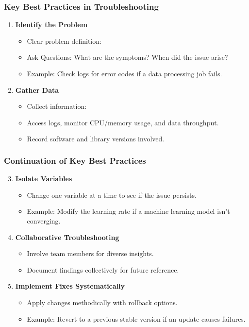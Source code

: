 \documentclass[aspectratio=169]{beamer}
\begin{document}
\begin{frame}[fragile]
    \frametitle{Key Best Practices in Troubleshooting}
    \begin{enumerate}
        \item \textbf{Identify the Problem}
        \begin{itemize}
            \item Clear problem definition:
            \item Ask Questions: What are the symptoms? When did the issue arise? 
            \item Example: Check logs for error codes if a data processing job fails.
        \end{itemize}
        
        \item \textbf{Gather Data}
        \begin{itemize}
            \item Collect information: 
            \item Access logs, monitor CPU/memory usage, and data throughput.
            \item Record software and library versions involved.
        \end{itemize}
    \end{enumerate}
\end{frame}

\begin{frame}[fragile]
    \frametitle{Continuation of Key Best Practices}
    \begin{enumerate}
        \setcounter{enumi}{2} %
        \item \textbf{Isolate Variables}
        \begin{itemize}
            \item Change one variable at a time to see if the issue persists.
            \item Example: Modify the learning rate if a machine learning model isn’t converging.
        \end{itemize}

        \item \textbf{Collaborative Troubleshooting}
        \begin{itemize}
            \item Involve team members for diverse insights.
            \item Document findings collectively for future reference.
        \end{itemize}

        \item \textbf{Implement Fixes Systematically}
        \begin{itemize}
            \item Apply changes methodically with rollback options.
            \item Example: Revert to a previous stable version if an update causes failures.
        \end{itemize}
    \end{enumerate}
\end{frame}
\end{document}
